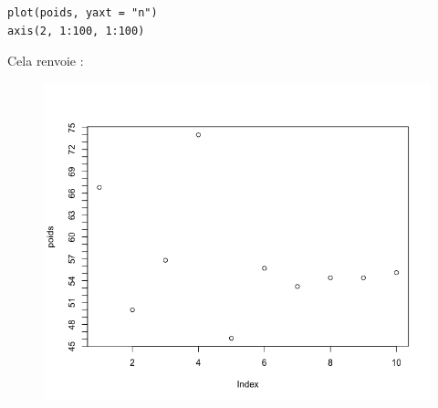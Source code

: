 \begin{lstlisting}[language=html]
plot(poids, yaxt = "n")
axis(2, 1:100, 1:100)
\end{lstlisting}
Cela renvoie :
\begin{figure}[H]\begin{center}\includegraphics[scale=0.4]{ilu/gra66.png}\end{center}\end{figure}
